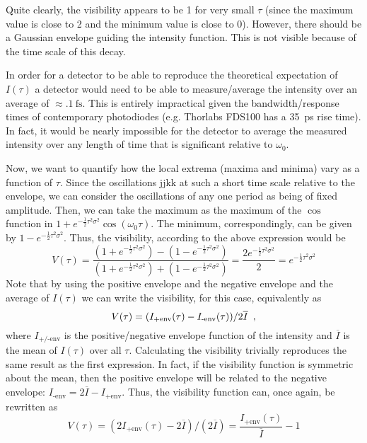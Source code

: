 \begin{homeworkProblem}
    Quite clearly, the visibility appears to be 1 for very small $ \tau $ (since
    the maximum value is close to 2 and the minimum value is close to 0).
    However, there should be a Gaussian envelope guiding the intensity function.
    This is not visible because of the time scale of this decay.

    In order for a detector to be able to reproduce the theoretical expectation
    of $ I(\tau) $ a detector would need to be able to measure/average the
    intensity over an average of $ \approx \SI{.1}{\femto\second} $. This is
    entirely impractical given the bandwidth/response times of contemporary
    photodiodes (e.g. Thorlabs FDS100 has a \SI{35}{\pico\second} rise time). In
    fact, it would be nearly impossible for the detector to average the measured
    intensity over any length of time that is significant relative to $ \omega_0
    $.

    Now, we want to quantify how the local extrema (maxima and minima) vary as a
    function of $ \tau $. Since the oscillations jjkk at such a short time
    scale relative to the envelope, we can consider the oscillations of any one
    period as being of fixed amplitude. Then, we can take the maximum as the
    maximum of the $\cos$ function in $ 1 + e^{-\frac{1}{2}\tau^2
    \sigma^2}\cos(\omega_{0}\tau) $. The minimum, correspondingly, can be given
    by $ 1 - e^{-\frac{1}{2}\tau^2 \sigma^2} $. Thus, the visibility, according
    to the above expression would be
    \[
        V(\tau) = \frac{\left( 1 + e^{-\frac{1}{2}\tau^2 \sigma^2}\right) -
        \left( 1 - e^{-\frac{1}{2}\tau^2 \sigma^2}\right)}
        {\left( 1 + e^{-\frac{1}{2}\tau^2 \sigma^2}\right) + \left( 1 -
        e^{-\frac{1}{2}\tau^2 \sigma^2}\right)}
        =
        \frac{2 e^{-\frac{1}{2}\tau^2 \sigma^2}}{2}
        =
        e^{-\frac{1}{2}\tau^2 \sigma^2}
    \]
    Note that by using the positive envelope and the negative envelope and
    the average of $ I(\tau) $ we can write the visibility, for this case,
    equivalently as
    \[
        V(\tau) = (I_{\textrm{+env}}(\tau) - I_{\textrm{-env}}(\tau)) /
        2 \overline{I} \enskip,
    \]
    where $ I_{\textrm{+/-env}} $ is the positive/negative envelope function of
    the intensity and $ \overline{I} $ is the mean of $ I(\tau) $ over all $
    \tau $. Calculating the visibility trivially reproduces the same result as
    the first expression. In fact, if the visibility function is symmetric about
    the mean, then the positive envelope will be related to the negative
    envelope: $ I_{\textrm{-env}} = 2 \overline{I} - I_{\textrm{+env}} $. Thus,
    the visibility function can, once again, be rewritten as
    \[
        V(\tau) = (2 I_{\textrm{+env}}(\tau) - 2 \overline{I}) /
        (2 \overline{I})
        = \frac{I_{\textrm{+env}}(\tau)}{\overline{I}} - 1
    \]


\end{homeworkProblem}
